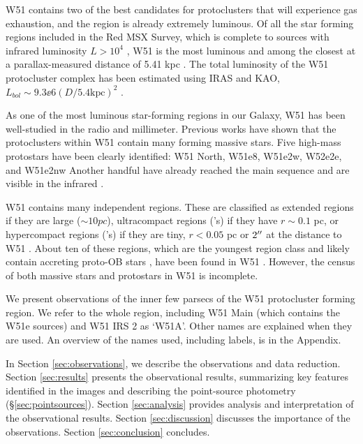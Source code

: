 W51 contains two of the best candidates for protoclusters that will experience
gas exhaustion, and the region is already extremely luminous.  Of all the star
forming regions included in the Red MSX Survey, which is complete to sources
with infrared luminosity $L>10^4$ \lsun, W51 is the most luminous
\citep{Urquhart2014a} and among the closest at a parallax-measured distance of
5.41 kpc \citep{Sato2010a,Xu2009a}.  The total luminosity of the W51
protocluster complex has been estimated using IRAS and KAO,
$L_{bol}\sim9.3\ee{6} (D/5.4\mathrm{kpc})^2$ \lsun
\citep{Harvey1986a,Sievers1991a}.  

As one of the most luminous star-forming regions in our Galaxy, W51 has been
well-studied in the radio and millimeter.  
Previous works have shown that the protoclusters within W51 contain many
forming massive stars. Five high-mass protostars have been clearly identified:
W51 North, W51e8, W51e2w, W52e2e, and W51e2nw
\citep{Zhang1997a,Keto2008b,Zapata2008a,Zapata2009a,Zapata2010a,Shi2010b,Shi2010a,Goddi2015a}
Another handful have already reached the main sequence and are visible in the
infrared \citep{Goldader1994a,Okumura2000a,Kumar2004a,Barbosa2008a,Figueredo2008a}.

W51 contains many independent \hii regions.  These are classified as extended
\hii regions if they are large ($\sim10 pc$), ultracompact \hii regions
(\uchii's) if they have $r\sim0.1$ pc, or hypercompact \hii regions (\hchii's)
if they are tiny, $r<0.05$ pc or $2\mbox{$^{\prime\prime}$}$ at the distance to W51
\citep{Kurtz2002a}.  About ten of these \hchii regions, which are the youngest
\hii region class and likely contain accreting proto-OB stars
\citep{Peters2010c}, have been found in W51 \citep{Mehringer1994a}.  However,
the census of both massive stars and protostars in W51 is incomplete.

We present observations of the inner few parsecs of the W51 protocluster
forming region.  We refer to the whole region, including W51 Main (which
contains the W51e sources) and W51 IRS 2 as `W51A'.  Other names are explained
when they are used.  An overview of the names used, including labels, is in the
Appendix.

In Section \ref{sec:observations}, we describe the observations and data
reduction.  Section \ref{sec:results} presents the observational results,
summarizing key features identified in the images and describing the
point-source photometry (\S \ref{sec:pointsources}).  Section
\ref{sec:analysis} provides analysis and interpretation of the observational
results.  Section \ref{sec:discussion} discusses the importance of the
observations.  Section \ref{sec:conclusion} concludes.

